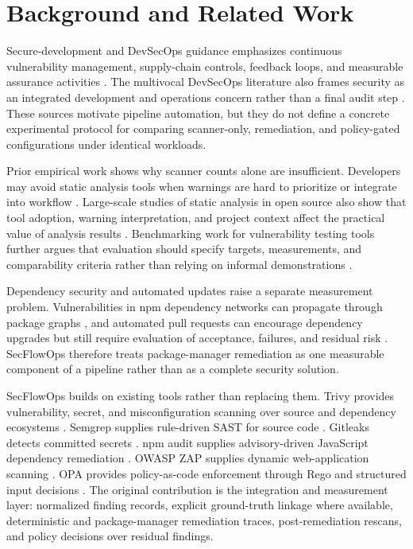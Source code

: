 \section{Background and Related Work}

Secure-development and DevSecOps guidance emphasizes continuous vulnerability management, supply-chain controls, feedback loops, and measurable assurance activities \cite{nistSP800204D,nistSSDF,owaspSAMM}. The multivocal DevSecOps literature also frames security as an integrated development and operations concern rather than a final audit step \cite{myrbakkenDevSecOps2017}. These sources motivate pipeline automation, but they do not define a concrete experimental protocol for comparing scanner-only, remediation, and policy-gated configurations under identical workloads.

Prior empirical work shows why scanner counts alone are insufficient. Developers may avoid static analysis tools when warnings are hard to prioritize or integrate into workflow \cite{johnsonStaticAnalysis2013}. Large-scale studies of static analysis in open source also show that tool adoption, warning interpretation, and project context affect the practical value of analysis results \cite{bellerStaticAnalysis2016}. Benchmarking work for vulnerability testing tools further argues that evaluation should specify targets, measurements, and comparability criteria rather than relying on informal demonstrations \cite{pariziBenchmark2018}.

Dependency security and automated updates raise a separate measurement problem. Vulnerabilities in npm dependency networks can propagate through package graphs \cite{decanNpm2018}, and automated pull requests can encourage dependency upgrades but still require evaluation of acceptance, failures, and residual risk \cite{mirhosseiniPullRequests2017}. SecFlowOps therefore treats package-manager remediation as one measurable component of a pipeline rather than as a complete security solution.

SecFlowOps builds on existing tools rather than replacing them. Trivy provides vulnerability, secret, and misconfiguration scanning over source and dependency ecosystems \cite{trivyDocs}. Semgrep supplies rule-driven SAST for source code \cite{semgrepDocs}. Gitleaks detects committed secrets \cite{gitleaksRepo}. npm audit supplies advisory-driven JavaScript dependency remediation \cite{npmAudit}. OWASP ZAP supplies dynamic web-application scanning \cite{zapDocs}. OPA provides policy-as-code enforcement through Rego and structured input decisions \cite{opaDocs}. The original contribution is the integration and measurement layer: normalized finding records, explicit ground-truth linkage where available, deterministic and package-manager remediation traces, post-remediation rescans, and policy decisions over residual findings.

